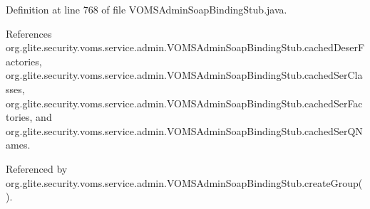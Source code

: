 \label{classorg_1_1glite_1_1security_1_1voms_1_1service_1_1admin_1_1VOMSAdminSoapBindingStub_a8c426e4b46b695345dec8ba4e014ec1b}


Definition at line 768 of file VOMSAdminSoapBindingStub.java.



References org.glite.security.voms.service.admin.VOMSAdminSoapBindingStub.cachedDeserFactories, org.glite.security.voms.service.admin.VOMSAdminSoapBindingStub.cachedSerClasses, org.glite.security.voms.service.admin.VOMSAdminSoapBindingStub.cachedSerFactories, and org.glite.security.voms.service.admin.VOMSAdminSoapBindingStub.cachedSerQNames.



Referenced by org.glite.security.voms.service.admin.VOMSAdminSoapBindingStub.createGroup().



